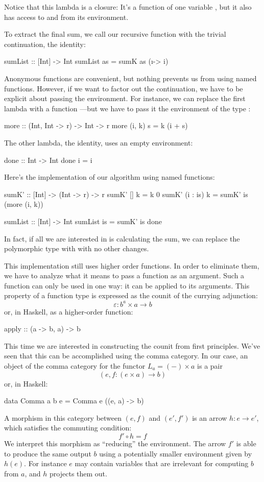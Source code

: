 \documentclass[DaoFP]{subfiles}
\begin{document}
Notice that this lambda is a closure: It's a function of one variable , but it also has access to  and  from its environment.

To extract the final sum, we call our recursive function with the trivial continuation, the identity:
\begin{haskell}
sumList :: [Int] -> Int
sumList as = sumK as (\i -> i)
\end{haskell}

Anonymous functions are convenient, but nothing prevents us from using named functions. However, if we want to factor out the continuation, we have to be explicit about passing the environment. For instance, we can replace the first lambda with a function ---but we have to pass it the environment of the type :
\begin{haskell}
more :: (Int, Int -> r) -> Int -> r
more (i, k) s = k (i + s)
\end{haskell}
The other lambda, the identity, uses an empty environment:
\begin{haskell}
done :: Int -> Int
done i = i
\end{haskell}
Here's the implementation of our algorithm using named functions:
\begin{haskell}
sumK' :: [Int] -> (Int -> r) -> r
sumK' [] k = k 0
sumK' (i : is) k =
  sumK' is (more (i, k))
\end{haskell}

\begin{haskell}
sumList :: [Int] -> Int
sumList is = sumK' is done
\end{haskell}

In fact, if all we are interested in is calculating the sum, we can replace the polymorphic type  with  with no other changes.

This implementation still uses higher order functions. In order to eliminate them, we have to analyze what it means to pass a function as an argument. Such a function can only be used in one way: it can be applied to its arguments. This property of a function type is expressed as the counit of the currying adjunction:
\[ \varepsilon \colon b^a \times a \to b \]
or, in Haskell, as a higher-order function:
\begin{haskell}
apply :: (a -> b, a) -> b
\end{haskell}
This time we are interested in constructing the counit from first principles. We've seen that this can be accomplished using the comma category. In our case, an object of the comma category for the functor $L_a = (-) \times a$ is a pair 
\[(e, f \colon (e \times a) \to b) \]
or, in Haskell:
\begin{haskell}
data Comma a b e = Comma e ((e, a) -> b)
\end{haskell}
A morphism in this category between $(e, f)$ and $(e', f')$ is an arrow $h \colon e \to e'$, which satisfies the commuting condition:
\[ f' \circ h = f \]
We interpret this morphism as ``reducing'' the environment. The arrow $f'$ is able to produce the same output $b$ using a potentially smaller environment given by $h (e)$. For instance $e$ may contain variables that are irrelevant for computing $b$ from $a$, and $h$ projects them out. 
\end{document}
